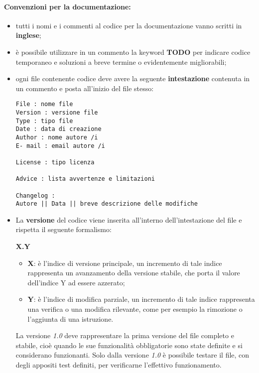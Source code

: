 \documentclass[NormeDiProgetto.tex]{subfiles}
\begin{document}
\paragraph*{Convenzioni per la documentazione: }
\begin{itemize}
	\item tutti i nomi e i commenti al codice per la documentazione vanno scritti in \textbf{inglese};
	\item è possibile utilizzare in un commento la keyword \textbf{TODO} per indicare codice temporaneo e soluzioni a breve termine o evidentemente migliorabili;
	\item ogni file contenente codice deve avere la seguente \textbf{intestazione} contenuta in un commento e posta all'inizio del file stesso:
\begin{center}{
\begin{minipage}{12cm}
\begin{Verbatim}[frame=single]
File : nome file
Version : versione file
Type : tipo file
Date : data di creazione
Author : nome autore /i
E- mail : email autore /i

License : tipo licenza

Advice : lista avvertenze e limitazioni

Changelog :
Autore || Data || breve descrizione delle modifiche
\end{Verbatim}
\end{minipage}
}
\end{center}
	\item La \textbf{versione} del codice viene inserita all’interno dell’intestazione del file e rispetta il
	seguente formalismo:
	\begin{center}{\textbf{X.Y}}\end{center}	
	\begin{itemize}
		\item \textbf{X}: è l’indice di versione principale, un incremento di tale indice rappresenta un avanzamento della versione stabile, che porta il valore dell’indice Y ad essere azzerato;
		\item \textbf{Y}: è l’indice di modifica parziale, un incremento di tale indice rappresenta una verifica o una modifica rilevante, come per esempio la rimozione o l’aggiunta di una istruzione.
	\end{itemize}
	La versione \textit{1.0} deve rappresentare la prima versione del file completo e stabile, cioè quando le sue funzionalità obbligatorie sono state definite e si considerano funzionanti. Solo dalla versione \textit{1.0} è possibile testare il file, con degli appositi test definiti, per	verificarne l’effettivo funzionamento.
\end{itemize}
\end{document}
